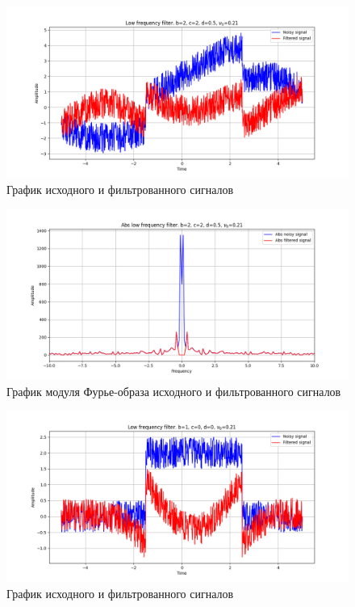 \documentclass[a4paper, 12pt]{article}
\begin{document}
    \begin{figure}[!htb]
        \centering
        \includegraphics[scale=0.485]{19_u_flt_u_nolow.png}
        \captionsetup{skip=0pt}
        \caption{График исходного и фильтрованного сигналов}
        \label{fig:fig63}
    \end{figure}
    \begin{figure}[!htb]
        \centering
        \includegraphics[scale=0.485]{19_abs_u_U_nolow.png}
        \captionsetup{skip=0pt}
        \caption{График модуля Фурье-образа исходного и фильтрованного сигналов}
        \label{fig:fig64}
    \end{figure}
    \begin{figure}[!htb]
        \centering
        \includegraphics[scale=0.485]{20_u_flt_u_nolow.png}
        \captionsetup{skip=0pt}
        \caption{График исходного и фильтрованного сигналов}
        \label{fig:fig65}
    \end{figure}
\end{document}
